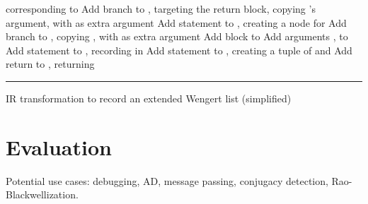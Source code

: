 \begin{algorithm}[p]
\begin{algorithmic}
    corresponding to 
    \State Add branch to , targeting the return block, copying 's
    argument, with  as extra argument
    \Else
    \State Add statement  to , creating a node for 
    \State Add branch to , copying , with  as
    extra argument
    \EndIf
    \EndFor
    \EndFor
    \Statex
    \State Add block  to 
    \State Add arguments ,  to 
    \State Add statement to , recording  in
    \State Add statement  to , creating a tuple of
     and 
    \State Add return to , returning 
  \end{algorithmic}
  \smallskip
  \hrule
  \caption{IR transformation to record an extended Wengert list (simplified) \label{alg:ir-transform}}
\end{algorithm}




\section{Evaluation}
\label{sec:irtracker-eval}

Potential use cases: debugging, AD, message passing, conjugacy detection, Rao-Blackwellization.

